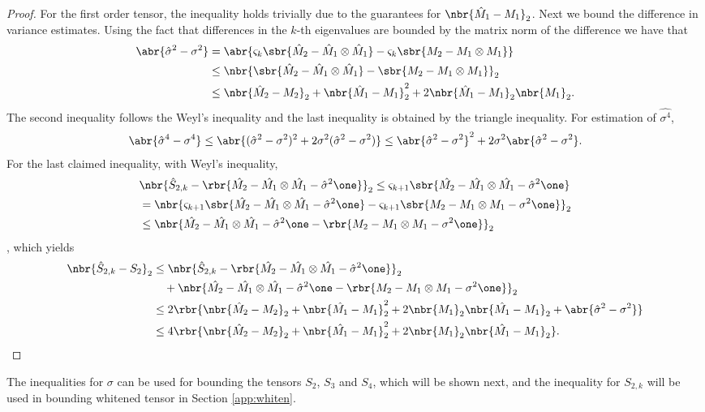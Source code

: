 \documentclass[twoside,11pt]{article}
\newcommand{\hatm}{\hat{M}}
\begin{document}
{\begin{proof}
For the first order tensor, the inequality holds trivially due to the
guarantees for $\nbr{\hat{M}_1 - M_1}_2$. Next we bound the difference in
variance estimates. Using the fact that differences in the $k$-th
eigenvalues are bounded by the matrix norm of the difference we have
that
  \begin{align}
    \abr{\hat{\sigma}^2 - \sigma^2 } 
    & = \abr{\varsigma_k \sbr{\hatm_2-\hatm_1 \otimes \hatm_1 } -
    \varsigma_k{\sbr{{M_2} - {M_1} \otimes {M_1}}} }  \\
    & \leq \nbr{\sbr{\hatm_2-\hatm_1 \otimes \hatm_1 } - {\sbr{{M_2} -
        {M_1} \otimes {M_1}}} }_2 \\
    & \leq \nbr{\hat{M}_2-M_2}_2 +   \nbr{\hat{M}_1-M_1}_2^2+2\nbr{\hat{M}_1-M_1}_2\nbr{M_1}_2.
  \end{align}
The second inequality follows the Weyl's inequality and the last inequality is obtained by the triangle inequality.
For estimation of $\hat{\sigma^4}$,
  \begin{align}
    \abr{\hat{\sigma}^4 - \sigma^4} \leq \abr{ ( \hat{\sigma}^2 - \sigma^2)^2 + 2\sigma^2(\hat{\sigma}^2 - \sigma^2) } \leq  \abr{ \hat{\sigma}^2 - \sigma^2 }^2 + 2 \sigma^2 \abr{\hat{\sigma}^2 - \sigma^2}.
  \end{align}
For the last claimed inequality, with Weyl's inequality, 
\begin{align}
 &\nbr{\hat{S}_{2,k} - \rbr{\hat{M_2} - \hat{M_1} \otimes \hat{M_1} - \hat{\sigma}^2 \one}}_2 \leq \varsigma_{k+1}\sbr{\hat{M_2} - \hat{M_1} \otimes \hat{M_1} - \hat{\sigma}^2 \one } \\ &=\nbr{  \varsigma_{k+1}\sbr{\hat{M_2} - \hat{M_1} \otimes \hat{M_1} - \hat{\sigma}^2 \one } -  \varsigma_{k+1}\sbr{M_2 - M_1 \otimes M_1 - \sigma^2 \one } }_2 \\&\leq \nbr{\hat{M_2} - \hat{M_1} \otimes \hat{M_1} - \hat{\sigma}^2 \one - \rbr{M_2 - M_1 \otimes M_1 - \sigma^2 \one}}_2
\end{align}
, which yields
  \begin{align}
    \nbr{\hat{S}_{2,k}-S_2}_2& \leq \nbr{\hat{S}_{2,k} - \rbr{\hat{M_2} - \hat{M_1} \otimes \hat{M_1} - \hat{\sigma}^2 \one}}_2\nonumber\\
    &\,\,\,\,\,\, + \nbr{\hat{M_2} - \hat{M_1} \otimes \hat{M_1} - \hat{\sigma}^2 \one - \rbr{M_2 - M_1 \otimes M_1 - \sigma^2 \one}}_2\\
    &\leq 2 \rbr{\nbr{\hat{M}_2 - M_2}_2 + \nbr{\hat{M_1}-M_1}_2^2 + 2\nbr{M_1}_2 \nbr{\hat{M_1}-M_1}_2 + \abr{\hat{\sigma}^2  -\sigma^2} }\\
    &\leq 4 \rbr{\nbr{\hat{M}_2 - M_2}_2 + \nbr{\hat{M_1}-M_1}_2^2 + 2\nbr{M_1}_2 \nbr{\hat{M_1}-M_1}_2}.
  \end{align} 
\end{proof}
 The inequalities for $\sigma$ can be used for bounding the tensors $S_2$, $S_3$ and $S_4$, which will be shown next, and the inequality for $S_{2,k}$ will be used in bounding whitened tensor in Section \ref{app:whiten}.

}
\end{document}
